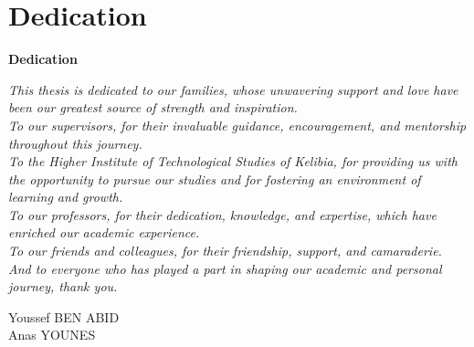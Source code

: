\newpage
\section*{Dedication}

\begin{center}
    \textbf{Dedication}
\end{center}

\begin{flushright}
    \textit{This thesis is dedicated to our families, whose unwavering support and love have been our greatest source of strength and inspiration.\\
    To our supervisors, for their invaluable guidance, encouragement, and mentorship throughout this journey.\\
    To the Higher Institute of Technological Studies of Kelibia, for providing us with the opportunity to pursue our studies and for fostering an environment of learning and growth.\\
    To our professors, for their dedication, knowledge, and expertise, which have enriched our academic experience.\\
    To our friends and colleagues, for their friendship, support, and camaraderie.\\
    And to everyone who has played a part in shaping our academic and personal journey, thank you.}
\end{flushright}

\begin{flushright}
    \LARGE Youssef BEN ABID \\
    \LARGE Anas YOUNES
\end{flushright}